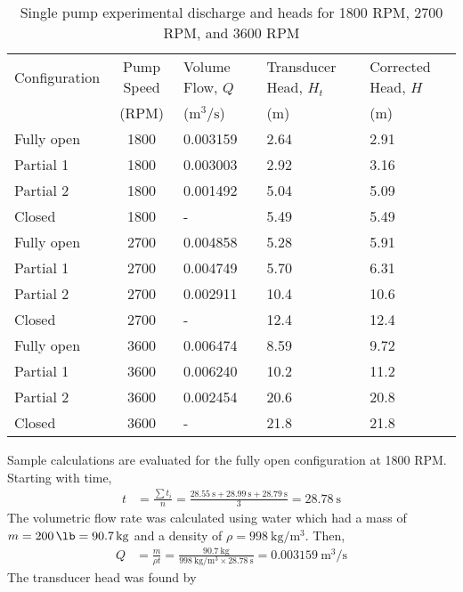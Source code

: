 \begin{table}[H]
    \centering
    \caption{Single pump experimental discharge and heads for 1800 RPM, 2700 RPM, and 3600 RPM}
    \label{tab:single_pump_discharge_and_heads}
    \begin{tabular}{lcC{0.15\textwidth}C{0.15\textwidth}C{0.15\textwidth}}
    \toprule
    Configuration & Pump Speed & Volume Flow, $Q$ & Transducer Head, $H_t$ & Corrected Head, $H$ \\
    & (RPM) & ($\unit{\meter\cubed\per\second}$) & (m) & (m) \\
    \midrule
    Fully open & 1800 & 0.003159 & 2.64 & 2.91 \\
    Partial 1 & 1800 & 0.003003 & 2.92 & 3.16 \\
    Partial 2 & 1800 & 0.001492 & 5.04 & 5.09 \\
    Closed & 1800 & - & 5.49 & 5.49 \\
    Fully open & 2700 & 0.004858 & 5.28 & 5.91 \\
    Partial 1 & 2700 & 0.004749 & 5.70 & 6.31 \\
    Partial 2 & 2700 & 0.002911 & 10.4 & 10.6 \\
    Closed & 2700 & - & 12.4 & 12.4 \\
    Fully open & 3600 & 0.006474 & 8.59 & 9.72 \\
    Partial 1 & 3600 & 0.006240 & 10.2 & 11.2 \\
    Partial 2 & 3600 & 0.002454 & 20.6 & 20.8 \\
    Closed & 3600 & - & 21.8 & 21.8 \\
    \bottomrule
    \end{tabular}
\end{table}
\noindent Sample calculations are evaluated for the fully open configuration at 1800 RPM. Starting with time,
\begin{align*}
        t &= \frac{\sum t_i}{n} = \frac{\qty{28.55}{\second} + \qty{28.99}{\second} + \qty{28.79}{\second}}{3} = \qty{28.78}{\second}
\end{align*}
The volumetric flow rate was calculated using water which had a mass of $m = \qty{200}{\lb} = \qty{90.7}{\kilo\gram}$ and a density of $\rho = \qty{998}{\kilo\gram\per\meter\cubed}$. Then,
\begin{align*}
    Q &= \frac{m}{\rho t} = \frac{\qty{90.7}{\kilo\gram}}{\qty{998}{\kilo\gram\per\meter\cubed} \times \qty{28.78}{\second}} = \qty{0.003159}{\meter\cubed\per\second}
\end{align*}
The transducer head was found by
